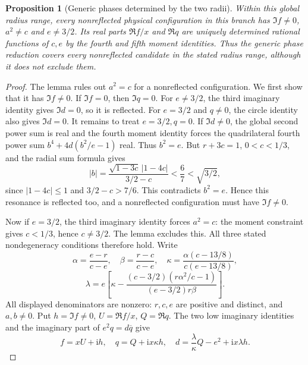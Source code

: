 \documentclass[11pt,a4paper]{article}
\newtheorem{proposition}[theorem]{Proposition}
\theoremstyle{remark}
\begin{document}
\begin{proposition}[Generic phases determined by the two radii]
\label{prop:134-new-phases}
Within this global radius range, every nonreflected physical
configuration in this branch has \(\Im f\ne0\), \(a^2\ne c\) and
\(e\ne3/2\). Its real parts
\(\Re f/x\) and \(\Re q\) are uniquely determined rational functions
of \(c,e\) by the fourth and fifth moment identities.
Thus the generic phase reduction covers every nonreflected candidate
in the stated radius range, although it does not exclude them.
\end{proposition}
\begin{proof}
The lemma rules out \(a^2=c\) for a nonreflected configuration.
We first show that it has \(\Im f\ne0\). If \(\Im f=0\), then
\(\Im q=0\). For \(e\ne3/2\), the third imaginary identity gives
\(\Im d=0\), so it is reflected. For \(e=3/2\) and \(q\ne0\),
the circle identity also gives \(\Im d=0\). It remains to treat
\(e=3/2,q=0\). If \(\Im d\ne0\), the global second power sum is
real and the fourth moment identity forces the quadrilateral fourth
power sum \(b^4+4d(b^2/e-1)\) real. Thus \(b^2=e\).
But \(r+3c=1\), \(0<c<1/3\), and the radial sum formula gives
\[
 |b|=\frac{\sqrt{1-3c}\,|1-4c|}{3/2-c}
       <\frac67<\sqrt{3/2},
\]
since \(|1-4c|\le1\) and \(3/2-c>7/6\).
This contradicts \(b^2=e\). Hence this resonance is reflected too,
and a nonreflected configuration must have \(\Im f\ne0\).

Now if \(e=3/2\), the third imaginary identity forces \(a^2=c\):
the moment constraint gives \(c<1/3\), hence \(c\ne3/2\).
The lemma excludes this. All three stated nondegeneracy conditions
therefore hold. Write
\[
 \alpha=\frac{e-r}{c-e},\quad \beta=\frac{r-c}{c-e},\quad
 \kappa=\frac{\alpha(c-13/8)}{c(e-13/8)},
\]
\[
 \lambda=e\left[\kappa-
    \frac{(c-3/2)(r\alpha^2/c-1)}{(e-3/2)r\beta}\right].
\]
All displayed denominators are nonzero: \(r,c,e\) are positive and
distinct, and \(a,b\ne0\). Put \(h=\Im f\ne0\),
\(U=\Re f/x\), \(Q=\Re q\). The two low imaginary identities and
the imaginary part of \(e^2q=d\overline q\) give
\begin{equation}\label{eq:134-new-parameters}
 f=xU+\mathrm i h,\quad q=Q+\mathrm i x\kappa h,\quad
 d=\frac{\lambda}{\kappa}Q-e^2+\mathrm i x\lambda h.
\end{equation}


\end{proof}
\end{document}

